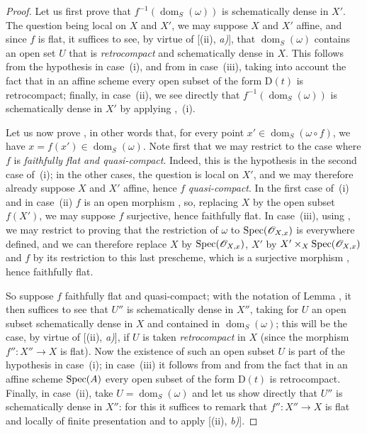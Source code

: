 \begin{proof}
Let us first prove that $f^{-1}(\operatorname{dom}_S(\omega))$ is schematically dense in $X'$.
The question being local on $X$ and $X'$, we may suppose $X$ and $X'$ affine, and since $f$ is flat, it suffices to see, by virtue of [(ii), \emph{a)}], that $\operatorname{dom}_S(\omega)$ contains an open set $U$ that is \emph{retrocompact} and schematically dense in $X$.
This follows from the hypothesis in case~(i), and from  in case~(iii), taking into account the fact that in an affine scheme every open subset of the form $\mathrm{D}(t)$ is retrocompact; finally, in case~(ii), we see directly that $f^{-1}(\operatorname{dom}_S(\omega))$ is schematically dense in $X'$ by applying ,~(i).

Let us now prove , in other words that, for every point $x'\in\operatorname{dom}_S(\omega\circ f)$, we have $x=f(x')\in\operatorname{dom}_S(\omega)$.
Note first that we may restrict to the case where $f$ is \emph{faithfully flat and quasi-compact}.
Indeed, this is the hypothesis in the second case of~(i); in the other cases, the question is local on $X'$, and we may therefore already suppose $X$ and $X'$ affine, hence $f$ \emph{quasi-compact}.
In the first case of~(i) and in case~(ii) $f$ is an open morphism , so, replacing $X$ by the open subset $f(X')$, we may suppose $f$ surjective, hence faithfully flat.
In case~(iii), using , we may restrict to proving that the restriction of $\omega$ to $\operatorname{Spec}(\mathscr{O}_{X,x})$ is everywhere defined, and we can therefore replace $X$ by $\operatorname{Spec}(\mathscr{O}_{X,x})$, $X'$ by $X'\times_X\operatorname{Spec}(\mathscr{O}_{X,x})$ and $f$ by its restriction to this last prescheme, which is a surjective morphism , hence faithfully flat.

So suppose $f$ faithfully flat and quasi-compact; with the notation of Lemma , it then suffices to see that $U''$ is schematically dense in $X''$, taking for $U$ an open subset schematically dense in $X$ and contained in $\operatorname{dom}_S(\omega)$; this will be the case, by virtue of [(ii), \emph{a)}], if $U$ is taken \emph{retrocompact} in $X$ (since the morphism $f'':X''\to X$ is flat).
Now the existence of such an open subset $U$ is part of the hypothesis in case~(i); in case~(iii) it follows from  and from the fact that in an affine scheme $\operatorname{Spec}(A)$ every open subset of the form $\mathrm{D}(t)$ is retrocompact.
Finally, in case~(ii), take $U=\operatorname{dom}_S(\omega)$ and let us show directly that $U''$ is schematically dense in $X''$: for this it suffices to remark that $f'':X''\to X$ is flat and locally of finite presentation and to apply [(ii), \emph{b)}].
\end{proof}

